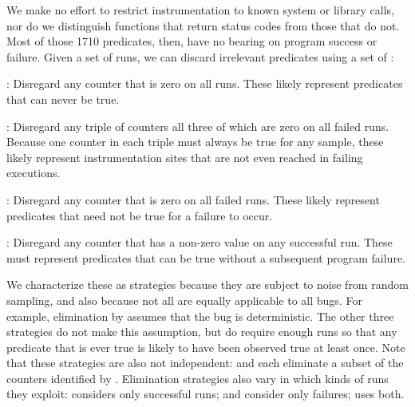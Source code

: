 We make no effort to restrict instrumentation to known
system or library calls, nor do we distinguish
functions that return status codes from those that do not.  
Most of those 1710 predicates,
then, have no bearing on program success or failure.
Given a set of runs, we can discard irrelevant predicates using a 
set of :

\begin{elimlist}
  \begin{sloppypar}
  \item[\elim{Elimination by universal falsehood}:] Disregard any
    counter that is zero on all runs.  These likely represent
    predicates that can never be true.
  \end{sloppypar}

\item[\elim{Elimination by lack of failing coverage}:] Disregard any
  triple of counters all three of which are zero on all failed runs.
  Because one counter in each triple must always be true for any
  sample, these likely represent instrumentation sites that are not
  even reached in failing executions.
  
\item[\elim{Elimination by lack of failing example}:] Disregard any
  counter that is zero on all failed runs.  These likely represent
  predicates that need not be true for a failure to occur.
  
\item[\elim{Elimination by successful counterexample}:] Disregard any
  counter that has a non-zero value on any successful run.  These
  must represent predicates that can be true without a subsequent
  program failure.
\end{elimlist}

We characterize these as strategies because they are subject to noise
from random sampling, and also because not all are equally applicable
to all bugs.  For example, elimination by  assumes that the bug is deterministic.  The other three
strategies do not make this assumption, but do require enough
runs so that any predicate that is ever true is likely to
have been observed true at least once.  Note that these
strategies are also not independent:  and
 each eliminate a subset of the
counters identified by .  Elimination
strategies also vary in which kinds of runs they exploit:
 considers only successful runs;
 and 
consider only failures;  uses both.

